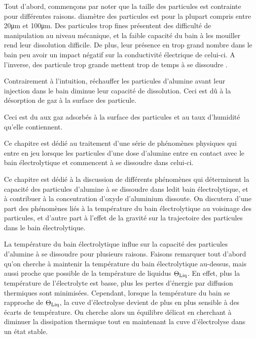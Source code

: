 Tout d'abord, commençons par noter que la taille des particules est
contrainte pour différentes raisons.
diamètre des particules est pour la plupart compris entre
\num{20}\si{\micro\meter} et \num{100}\si{\micro\meter}.
Des particules trop fines présentent des
difficulté de manipulation au niveau mécanique, et la faible
capacité du bain à les mouiller rend leur dissolution difficile. De
plus, leur présence en trop grand nombre dans le bain peu avoir un
impact négatif sur la conductivité électrique de celui-ci. A
l'inverse, des particule trop grande mettent trop de temps à se
dissoudre \cite{Fini2017}.

Contrairement à l'intuition, réchauffer les particules d'alumine avant
leur injection dans le bain diminue leur capacité de dissolution. Ceci
est dû à la désorption de gaz à la surface des particule.

Ceci est du aux gaz adsorbés à la surface des particules et au
taux d'humidité qu'elle contiennent.







Ce chapitre est dédié au traitement d'une série de phénomènes
physiques qui entre en jeu lorsque les particules d'une dose d'alumine
entre en contact avec le bain électrolytique et commencent à se
dissoudre dans celui-ci.

Ce chapitre est dédié à la discussion de différents phénomènes qui
déterminent la capacité des particules d'alumine à se dissoudre dans
ledit bain électrolytique, et à contribuer à la concentration d'oxyde
d'aluminium dissoute. On discutera d'une part des phénomènes
liés à la température du bain électrolytique au voisinage des
particules, et d'autre part à l'effet de la gravité sur la
trajectoire des particules dans le bain électrolytique.

La température du bain électrolytique influe sur la capacité des
particules d'alumine à se dissoudre pour plusieurs raisons. Faisons
remarquer tout d'abord qu'on cherche à maintenir la température du
bain électrolytique au-dessus, mais aussi proche que possible de la
température de liquidus $\Theta_\text{Liq}$. En effet, plus la température de
l'électrolyte est basse, plus les pertes d'énergie par diffusion
thermiques sont minimisées. Cependant, lorsque la température du
bain se rapproche de $\Theta_\text{Liq}$, la cuve d'électrolyse
devient de plus en plus sensible à des écarts de température. On
cherche alors un équilibre délicat en cherchant à diminuer la
dissipation thermique tout en maintenant la cuve d'électrolyse dans
un état stable.

